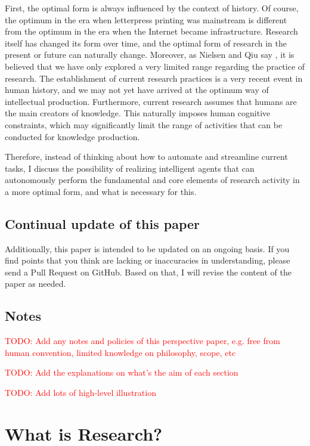 \documentclass{book}
\begin{document}
First, the optimal form is always influenced by the context of history. Of course, the optimum in the era when letterpress printing was mainstream is different from the optimum in the era when the Internet became infrastructure. Research itself has changed its form over time, and the optimal form of research in the present or future can naturally change. Moreover, as Nielsen and Qiu say \cite{nielsen}, it is believed that we have only explored a very limited range regarding the practice of research. The establishment of current research practices is a very recent event in human history, and we may not yet have arrived at the optimum way of intellectual production. Furthermore, current research assumes that humans are the main creators of knowledge. This naturally imposes human cognitive constraints, which may significantly limit the range of activities that can be conducted for knowledge production. 

Therefore, instead of thinking about how to automate and streamline current tasks, I discuss the possibility of realizing intelligent agents that can autonomously perform the fundamental and core elements of research activity in a more optimal form, and what is necessary for this.

\section{Continual update of this paper}

Additionally, this paper is intended to be updated on an ongoing basis. If you find points that you think are lacking or inaccuracies in understanding, please send a Pull Request on GitHub. Based on that, I will revise the content of the paper as needed.

\section{Notes}
\textcolor{red}{TODO: Add any notes and policies of this perspective paper, e.g. free from human convention, limited knowledge on philosophy, scope, etc}

\textcolor{red}{TODO: Add the explanations on what's the aim of each section}

\textcolor{red}{TODO: Add lots of high-level illustration}

\chapter{What is Research?}
\end{document}
